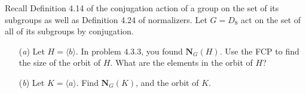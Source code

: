 \documentclass[12pt,letterpaper,boxed]{hmcpset}
\begin{document}
\clearpage

\begin{problem}[6.1.4]
Recall Definition 4.14 of the conjugation action of a group on the set of its subgroups as well as Definition 4.24 of normalizers. Let $G = D_8$ act on the set of all of its subgroups by conjugation. 
\begin{itemize}
  \item[(\textit{a})] Let $H = \langle b \rangle$. In problem $\textit{4.3.3}$, you found $\textbf{N}_G(H)$. Use the FCP to find the size of the orbit of $H$. What are the elements in the orbit of $H$?
  
  \item[(\textit{b})] Let $K = \langle a \rangle$. Find $\textbf{N}_G(K)$, and the orbit of $K$. 
\end{itemize}
\end{problem}

\begin{solution}

\end{solution}
\end{document}
